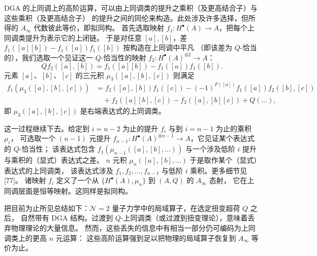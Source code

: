 DGA 的上同调上的高阶运算，可以由上同调类的提升之乘积（及更高结合子）与这些乘积（及更高结合子）
的提升之间的同伦来构造。此处涉及许多选择，但所得的 $A_\infty$ 代数彼此等价，即拟同构。
首先选取映射 $f_1:H^\bullet(A)\to A$，把每个上同调类提升为表示它的上闭链。
于是对任意 $[a],[b]$，差 $f_1([a][b]) - f_1([a])f_1([b])$ 按构造在上同调中平凡
（即该差为 $Q$-恰当的），我们选取一个见证这一 $Q$-恰当性的映射
$f_2:H^\bullet(A)^{\otimes 2}\to A$：
\begin{equation}\tag{3.26}
Q f_2([a],[b]) = f_1([a][b]) - f_1([a]) f_1([b]) .
\end{equation}
元素 $[a]$、$[b]$、$[c]$ 的三元积 $\mu_3([a],[b],[c])$ 则满足
\begin{equation}\tag{3.27}
\begin{aligned}
f_1(\mu_3([a],[b],[c])) &= f_2([a],[b])f_1([c]) - (-1)^{F([a])} f_1([a])f_2([b],[c]) \\
&\quad + f_2([a][b],[c]) - f_2([a],[b][c]) + Q(\dots) ,
\end{aligned}
\end{equation}
即 $\mu_3([a],[b],[c])$ 是右端表达式的上同调类。

这一过程继续下去。给定到 $i=n-2$ 为止的提升 $f_i$ 与到 $i=n-1$ 为止的乘积 $\mu_i$，
可选取一个 $(n-1)$ 元提升 $f_{n-1}:H^\bullet(A)^{\otimes n-1}\to A$，它见证某个表达式的 $Q$-恰当性；
该表达式包含 $f_1(\mu_{n-1}([a],[b],\dots))$ 与一个涉及低阶 $i$ 提升与乘积的（显式）表达式之差。
$n$ 元积 $\mu_n([a],[b],\dots)$ 于是取作某个（显式）表达式的上同调类，
该表达式涉及 $f_1,f_2,\dots,f_{n-1}$ 与低阶 $i$ 乘积。更多细节见 [77]。
诸映射 $f_i$ 定义了一个从 $\{H^\bullet(A),\mu_n\}$ 到 $(A,Q)$ 的 $A_\infty$ 态射，
它在上同调层面是恒等映射。这同样是拟同构。

把目前为止所见总结如下：$\mathcal{N}=2$ 量子力学中的局域算子，在选定扭变超荷 $Q$ 之后，
自然带有 DGA 结构。过渡到 $Q$-上同调类（或过渡到扭变理论），意味着丢弃物理理论的大量信息。
然而，这些丢失的信息中有相当一部分仍可编码为上同调类上的更高 $n$ 元运算：
这些高阶运算强到足以把物理的局域算子恢复到 $A_\infty$ 等价为止。

